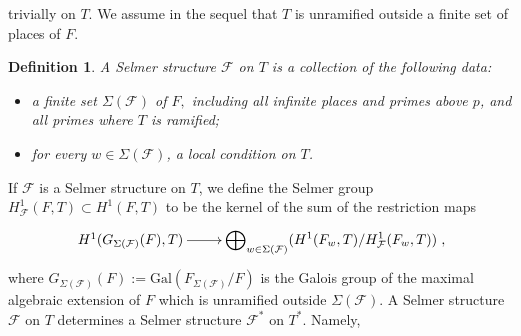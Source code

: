 \documentclass[reqno]{amsart}
\newcounter{dummy} \numberwithin{dummy}{section}
\newtheorem{deft}[dummy]{Definition}
\begin{document}
trivially on $T$. We assume in the sequel that $T$ is unramified
outside a finite set of places of $F$.
\begin{deft}
A Selmer structure $\mathcal{F}$ on $T$ is a collection of the
following data:
\begin{itemize}
    \item a finite set $\Sigma(\mathcal{F})$ of $F,$ including all infinite places and primes above $p$, and all primes
where $T$ is ramified;
    \item for every $w\in \Sigma(\mathcal{F})$, a local condition on
    $T$.
\end{itemize}
\end{deft}
 If $\mathcal{F}$ is a Selmer structure on $T$, we define the Selmer group
$H^{1}_{\mathcal{F}}(F,T)\subset H^{1}(F,T)$ to be the kernel of the
sum of the restriction maps
\begin{equation}\label{Selmer group definition}
\xymatrix@=2pc{H^{1}(G_{\Sigma(\mathcal{F})}(F),T)\ar[r]&
\displaystyle{{\bigoplus}_{w\in\Sigma(\mathcal{F})}}(H^{1}(F_{w},T)/H^{1}_{\mathcal{F}}(F_{w},T))},
\end{equation}
where
$G_{\Sigma(\mathcal{F})}(F):=\mathrm{Gal}(F_{\Sigma(\mathcal{F})}/F)$
is the Galois group of the maximal algebraic extension of $F$ which
is unramified outside $\Sigma(\mathcal{F})$.\vskip 6pt A  Selmer
structure $\mathcal{F}$ on $T$ determines a Selmer structure
$\mathcal{F}^{\ast}$ on $T^{\ast}$. Namely,
\end{document}
